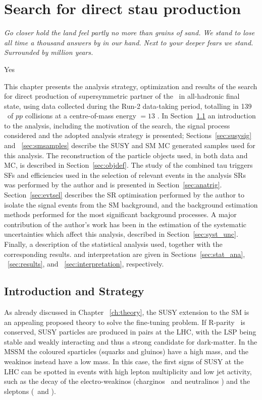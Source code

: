 \chapter{Search for direct stau production}
\label{ch:analysis}
\epigraph{\emph{Go closer hold the land feel partly no more than grains of sand. 
						We stand to lose all time a thousand answers by in our hand. 
						Next to your deeper fears we stand.
						Surrounded by million years.}}{Yes}

This chapter presents the analysis strategy, optimization and results of the search for direct production of supersymmetric partner of the \ltau\ in all-hadronic final state, using data collected during the Run-2 data-taking period, totalling in 139 \infb\ of $pp$ collisions at a centre-of-mass energy \com $=13$ \tev.
 In Section~\ref{sec:stratintro} an introduction to the analysis, including the motivation of the search, the signal process considered and the adopted analysis strategy is presented; 
 Sections~\ref{sec:susysig} and ~\ref{sec:smsamples} describe the \ac{SUSY} and \ac{SM} \ac{MC} generated samples used for this analysis.
 The reconstruction of the particle objects used, in both data and \ac{MC}, is described in Section~\ref{sec:objdef}. 
The study of the combined tau triggers \acp{SF} and efficiencies used in the selection of relevant events in the analysis \acp{SR} was performed by the author and is presented in Section~\ref{sec:anatrig}.
Section~\ref{sec:evtsel} describes the \ac{SR} optimisation performed by the author to isolate the signal events from the \ac{SM} background, and the background estimation methods performed for the most significant background processes. 
A major contribution of the author's work has been in the estimation of the systematic uncertainties which affect this analysis, described in Section~\ref{sec:syst_unc}. Finally, a description of the statistical analysis used, together with the corresponding results. and interpretation are given in Sections~\ref{sec:stat_ana}, ~\ref{sec:results}, and ~\ref{sec:interpretation}, respectively. 


	\section{Introduction and Strategy}
	\label{sec:stratintro}
	As already discussed in Chapter ~\ref{ch:theory}, the \ac{SUSY} extension to the \ac{SM} is an appealing proposed theory to solve the fine-tuning problem. If R-parity~\cite{JUNGMAN1996195} is conserved, \ac{SUSY} particles are produced in pairs at the \ac{LHC}, with the \ac{LSP} being stable and weakly interacting and thus a strong candidate for dark-matter.
	In the \ac{MSSM} the coloured sparticles (squarks and gluinos) have a high mass, and the weakinos instead have a low mass.
	 In this case, the first signs of \ac{SUSY} at the \ac{LHC} can be spotted in events with high lepton multiplicity and low jet activity, such as the decay of the electro-weakinos (charginos \chinopm\ and neutralinos \nino) and the sleptons (\slepton\ and \snu).
	 
